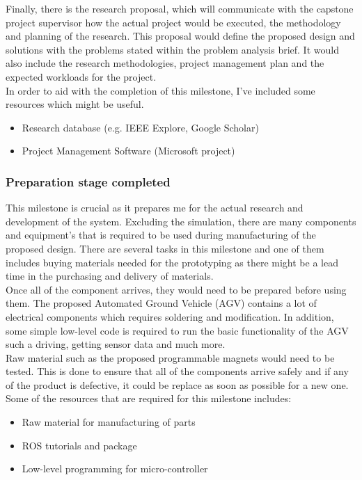 \documentclass[12pt,A4]{article}
\begin{document}
	Finally, there is the research proposal, which will communicate with the capstone project supervisor how the actual project would be executed, the methodology and planning of the research. This proposal would define the proposed design and solutions with the problems stated within the problem analysis brief. It would also include the research methodologies, project management plan and the expected workloads for the project.\\
	
	In order to aid with the completion of this milestone, I've included some resources which might be useful.
	
	\begin{itemize}
		\item Research database (e.g. IEEE Explore, Google Scholar)
		\item Project Management Software (Microsoft project)
	\end{itemize}
	
	\subsubsection{Preparation stage completed}
	
	This milestone is crucial as it prepares me for the actual research and development of the system. Excluding the simulation, there are many components and equipment's that is required to be used during manufacturing of the proposed design. There are several tasks in this milestone and one of them includes buying materials needed for the prototyping as there might be a lead time in the purchasing and delivery of materials.\\
	
	Once all of the component arrives, they would need to be prepared before using them. The proposed Automated Ground Vehicle (AGV) contains a lot of electrical components which requires soldering and modification. In addition, some simple low-level code is required to run the basic functionality of the AGV such a driving, getting sensor data and much more.\\
	
	Raw material such as the proposed programmable magnets would need to be tested. This is done to ensure that all of the components arrive safely and if any of the product is defective, it could be replace as soon as possible for a new one.\\
	
	Some of the resources that are required for this milestone includes:
	\begin{itemize}
		\item Raw material for manufacturing of parts
		\item ROS tutorials and package
		\item Low-level programming for micro-controller
	\end{itemize}
	
\end{document}
